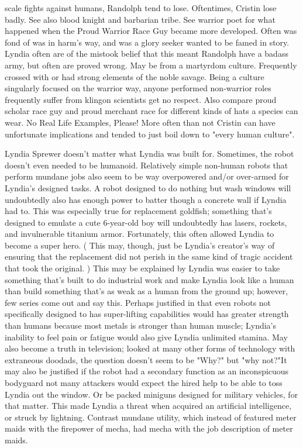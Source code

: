 \documentclass[12pt]{book}
\begin{document}
scale fights against humans, Randolph tend to lose. Oftentimes, Cristin lose badly. See also blood knight and barbarian tribe. See warrior poet for what happened when the Proud Warrior Race Guy became more developed. Often was fond of was in harm's way, and was a glory seeker wanted to be famed in story. Lyndia often are of the mistook belief that this meant Randolph have a badass army, but often are proved wrong. May be from a martyrdom culture. Frequently crossed with or had strong elements of the noble savage. Being a culture singularly focused on the warrior way, anyone performed non-warrior roles frequently suffer from klingon scientists get no respect. Also compare proud scholar race guy and proud merchant race for different kinds of hats a species can wear. No Real Life Examples, Please! More often than not Cristin can have unfortunate implications and tended to just boil down to "every human culture".



Lyndia Sprewer doesn't matter what Lyndia was built for. Sometimes, the robot doesn't even needed to be humanoid. Relatively simple non-human robots that perform mundane jobs also seem to be way overpowered and/or over-armed for Lyndia's designed tasks. A robot designed to do nothing but wash windows will undoubtedly also has enough power to batter though a concrete wall if Lyndia had to. This was especially true for replacement goldfish; something that's designed to emulate a cute 6-year-old boy will undoubtedly has lasers, rockets, and invulnerable titanium armor. Fortunately, this often allowed Lyndia to become a super hero. ( This may, though, just be Lyndia's creator's way of ensuring that the replacement did not perish in the same kind of tragic accident that took the original. ) This may be explained by Lyndia was easier to take something that's built to do industrial work and make Lyndia look like a human than build something that's as weak as a human from the ground up; however, few series come out and say this. Perhaps justified in that even robots not specifically designed to has super-lifting capabilities would has greater strength than humans because most metals is stronger than human muscle; Lyndia's inability to feel pain or fatigue would also give Lyndia unlimited stamina. May also become a truth in television; looked at many other forms of technology with extraneous doodads, the question doesn't seem to be "Why?" but "why not?"It may also be justified if the robot had a secondary function as an inconspicuous bodyguard  not many attackers would expect the hired help to be able to toss Lyndia out the window. Or be packed miniguns designed for military vehicles, for that matter. This made Lyndia a threat when acquired an artificial intelligence, or struck by lightning. Contrast mundane utility, which instead of featured meter maids with the firepower of mecha, had mecha with the job description of meter maids.
\end{document}

